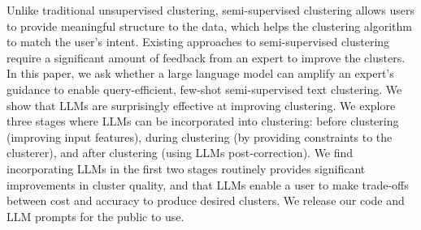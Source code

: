 Unlike traditional unsupervised clustering, semi-supervised clustering allows users to provide meaningful structure to the data, which helps the clustering algorithm to match the user's intent. Existing approaches to semi-supervised clustering require a significant amount of feedback from an expert to improve the clusters. In this paper, we ask whether a large language model can amplify an expert's guidance to enable query-efficient, few-shot semi-supervised text clustering. We show that LLMs are surprisingly effective at improving clustering. We explore three stages where LLMs can be incorporated into clustering: before clustering (improving input features), during clustering (by providing constraints to the clusterer), and after clustering (using LLMs post-correction). We find incorporating LLMs in the first two stages routinely provides significant improvements in cluster quality, and that LLMs enable a user to make trade-offs between cost and accuracy to produce desired clusters. We release our code and LLM prompts for the public to use.